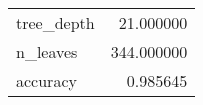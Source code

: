 \begin{tabular}{lr}
\toprule
 &  \\
\midrule
tree\_depth & 21.000000 \\
n\_leaves & 344.000000 \\
accuracy & 0.985645 \\
\bottomrule
\end{tabular}
